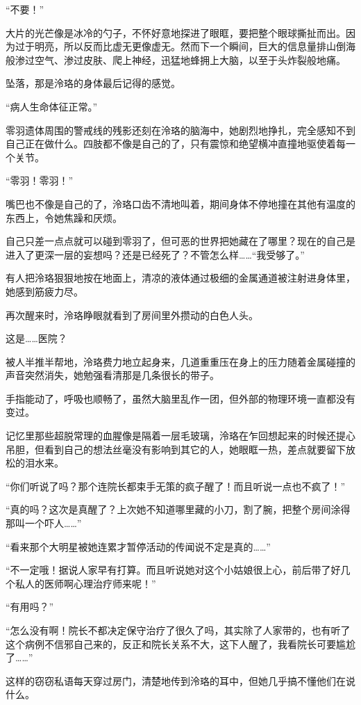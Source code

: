 \documentclass[UTF8, scheme = chinese, openany]{ctexbook}
\begin{document}
“不要！”

大片的光芒像是冰冷的勺子，不怀好意地探进了眼眶，要把整个眼球撕扯而出。因为过于明亮，所以反而比虚无更像虚无。然而下一个瞬间，巨大的信息量排山倒海般渗过空气、渗过皮肤、爬上神经，迅猛地蜂拥上大脑，以至于头炸裂般地痛。

坠落，那是泠珞的身体最后记得的感觉。

“病人生命体征正常。”

零羽遗体周围的警戒线的残影还刻在泠珞的脑海中，她剧烈地挣扎，完全感知不到自己正在做什么。四肢都不像是自己的了，只有震惊和绝望横冲直撞地驱使着每一个关节。

“零羽！零羽！”

嘴巴也不像是自己的了，泠珞口齿不清地叫着，期间身体不停地撞在其他有温度的东西上，令她焦躁和厌烦。

自己只差一点点就可以碰到零羽了，但可恶的世界把她藏在了哪里？现在的自己是进入了更深一层的妄想吗？还是已经死了？不管怎么样……“我受够了。”

有人把泠珞狠狠地按在地面上，清凉的液体通过极细的金属通道被注射进身体里，她感到筋疲力尽。

再次醒来时，泠珞睁眼就看到了房间里外攒动的白色人头。

这是……医院？

被人半推半帮地，泠珞费力地立起身来，几道重重压在身上的压力随着金属碰撞的声音突然消失，她勉强看清那是几条很长的带子。

手指能动了，呼吸也顺畅了，虽然大脑里乱作一团，但外部的物理环境一直都没有变过。

记忆里那些超脱常理的血腥像是隔着一层毛玻璃，泠珞在乍回想起来的时候还提心吊胆，但看到自己的想法丝毫没有影响到其它的人，她眼眶一热，差点就要留下放松的泪水来。

“你们听说了吗？那个连院长都束手无策的疯子醒了！而且听说一点也不疯了！”

“真的吗？这次是真醒了？上次她不知道哪里藏的小刀，割了腕，把整个房间涂得那叫一个吓人……”

“看来那个大明星被她连累才暂停活动的传闻说不定是真的……”

“不一定哦！据说人家早有打算。而且听说她对这个小姑娘很上心，前后带了好几个私人的医师啊心理治疗师来呢！”

“有用吗？”

“怎么没有啊！院长不都决定保守治疗了很久了吗，其实除了人家带的，也有听了这个病例不信邪自己来的，反正和院长关系不大，这下人醒了，我看院长可要尴尬了……”

这样的窃窃私语每天穿过房门，清楚地传到泠珞的耳中，但她几乎搞不懂他们在说什么。
\end{document}
